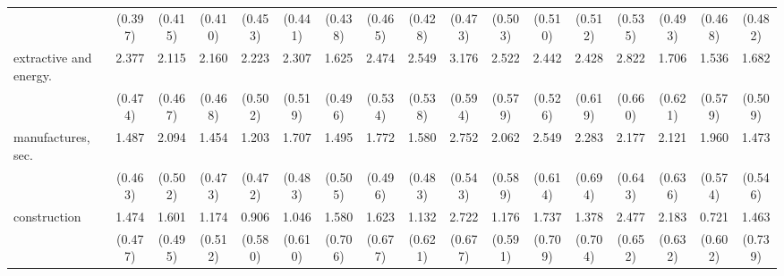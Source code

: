 {\begin{tabular}{l*{16}{c}}
                    &     (0.397)         &     (0.415)         &     (0.410)         &     (0.453)         &     (0.441)         &     (0.438)         &     (0.465)         &     (0.428)         &     (0.473)         &     (0.503)         &     (0.510)         &     (0.512)         &     (0.535)         &     (0.493)         &     (0.468)         &     (0.482)         \\
[1em]
extractive and energy.&       2.377\sym{***}&       2.115\sym{***}&       2.160\sym{***}&       2.223\sym{***}&       2.307\sym{***}&       1.625\sym{**} &       2.474\sym{***}&       2.549\sym{***}&       3.176\sym{***}&       2.522\sym{***}&       2.442\sym{***}&       2.428\sym{***}&       2.822\sym{***}&       1.706\sym{**} &       1.536\sym{**} &       1.682\sym{***}\\
                    &     (0.474)         &     (0.467)         &     (0.468)         &     (0.502)         &     (0.519)         &     (0.496)         &     (0.534)         &     (0.538)         &     (0.594)         &     (0.579)         &     (0.526)         &     (0.619)         &     (0.660)         &     (0.621)         &     (0.579)         &     (0.509)         \\
[1em]
manufactures, sec.  &       1.487\sym{**} &       2.094\sym{***}&       1.454\sym{**} &       1.203\sym{*}  &       1.707\sym{***}&       1.495\sym{**} &       1.772\sym{***}&       1.580\sym{**} &       2.752\sym{***}&       2.062\sym{***}&       2.549\sym{***}&       2.283\sym{***}&       2.177\sym{***}&       2.121\sym{***}&       1.960\sym{***}&       1.473\sym{**} \\
                    &     (0.463)         &     (0.502)         &     (0.473)         &     (0.472)         &     (0.483)         &     (0.505)         &     (0.496)         &     (0.483)         &     (0.543)         &     (0.589)         &     (0.614)         &     (0.694)         &     (0.643)         &     (0.636)         &     (0.574)         &     (0.546)         \\
[1em]
construction        &       1.474\sym{**} &       1.601\sym{**} &       1.174\sym{*}  &       0.906         &       1.046         &       1.580\sym{*}  &       1.623\sym{*}  &       1.132         &       2.722\sym{***}&       1.176\sym{*}  &       1.737\sym{*}  &       1.378         &       2.477\sym{***}&       2.183\sym{***}&       0.721         &       1.463\sym{*}  \\
                    &     (0.477)         &     (0.495)         &     (0.512)         &     (0.580)         &     (0.610)         &     (0.706)         &     (0.677)         &     (0.621)         &     (0.677)         &     (0.591)         &     (0.709)         &     (0.704)         &     (0.652)         &     (0.632)         &     (0.602)         &     (0.739)         \\

\end{tabular}}
